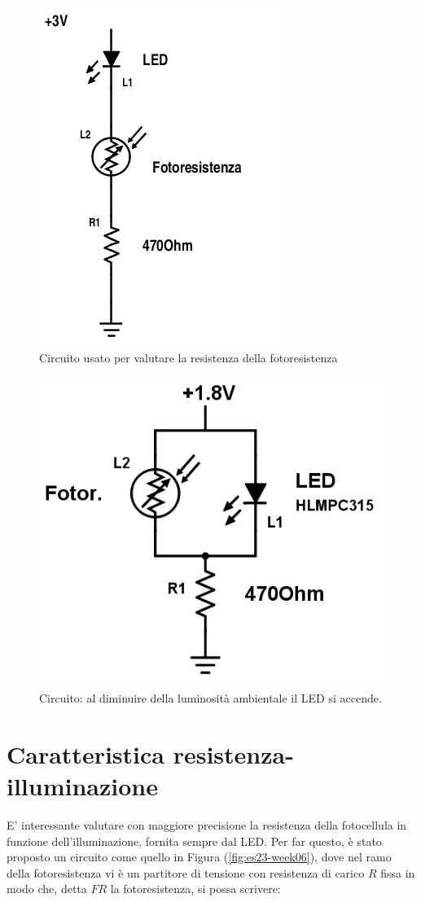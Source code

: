 \documentclass[journal, a4paper]{IEEEtran}
\begin{document}
\begin{figure}
\centering
\includegraphics[width=0.5\linewidth]{./es-18-week06}
\caption{Circuito usato per valutare la resistenza della fotoresistenza}
\label{fig:es-18-week06}
\end{figure}


\begin{figure}
\centering
\includegraphics[width=0.7\linewidth]{./week06-es20}
\caption{Circuito: al diminuire della luminosità ambientale il LED si accende.}
\label{fig:week06-es20}
\end{figure}


\section{Caratteristica resistenza-illuminazione}

E' interessante valutare con maggiore precisione la resistenza della fotocellula in funzione dell'illuminazione, fornita sempre dal LED. Per far questo, è stato proposto un circuito come quello in Figura (\ref{fig:es23-week06}), dove nel ramo della fotoresistenza vi è un partitore di tensione con resistenza di carico $R$ fissa in modo che, detta $FR$ la fotoresistenza, si possa scrivere:
\end{document}
